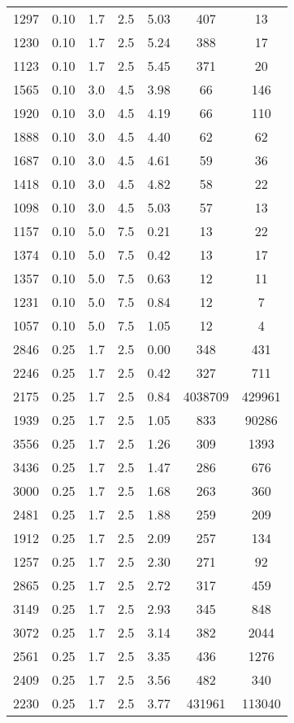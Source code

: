 \documentclass{aastex62}
\begin{document}
\begin{table}
\begin{tabular}{ccccccc}
1297 & 0.10 & 1.7 & 2.5 & 5.03 & 407 & 13 \\ 
1230 & 0.10 & 1.7 & 2.5 & 5.24 & 388 & 17 \\ 
1123 & 0.10 & 1.7 & 2.5 & 5.45 & 371 & 20 \\ 
1565 & 0.10 & 3.0 & 4.5 & 3.98 & 66 & 146 \\ 
1920 & 0.10 & 3.0 & 4.5 & 4.19 & 66 & 110 \\ 
1888 & 0.10 & 3.0 & 4.5 & 4.40 & 62 & 62 \\ 
1687 & 0.10 & 3.0 & 4.5 & 4.61 & 59 & 36 \\ 
1418 & 0.10 & 3.0 & 4.5 & 4.82 & 58 & 22 \\ 
1098 & 0.10 & 3.0 & 4.5 & 5.03 & 57 & 13 \\ 
1157 & 0.10 & 5.0 & 7.5 & 0.21 & 13 & 22 \\ 
1374 & 0.10 & 5.0 & 7.5 & 0.42 & 13 & 17 \\ 
1357 & 0.10 & 5.0 & 7.5 & 0.63 & 12 & 11 \\ 
1231 & 0.10 & 5.0 & 7.5 & 0.84 & 12 & 7 \\ 
1057 & 0.10 & 5.0 & 7.5 & 1.05 & 12 & 4 \\ 
2846 & 0.25 & 1.7 & 2.5 & 0.00 & 348 & 431 \\ 
2246 & 0.25 & 1.7 & 2.5 & 0.42 & 327 & 711 \\ 
2175 & 0.25 & 1.7 & 2.5 & 0.84 & 4038709 & 429961 \\ 
1939 & 0.25 & 1.7 & 2.5 & 1.05 & 833 & 90286 \\ 
3556 & 0.25 & 1.7 & 2.5 & 1.26 & 309 & 1393 \\ 
3436 & 0.25 & 1.7 & 2.5 & 1.47 & 286 & 676 \\ 
3000 & 0.25 & 1.7 & 2.5 & 1.68 & 263 & 360 \\ 
2481 & 0.25 & 1.7 & 2.5 & 1.88 & 259 & 209 \\ 
1912 & 0.25 & 1.7 & 2.5 & 2.09 & 257 & 134 \\ 
1257 & 0.25 & 1.7 & 2.5 & 2.30 & 271 & 92 \\ 
2865 & 0.25 & 1.7 & 2.5 & 2.72 & 317 & 459 \\ 
3149 & 0.25 & 1.7 & 2.5 & 2.93 & 345 & 848 \\ 
3072 & 0.25 & 1.7 & 2.5 & 3.14 & 382 & 2044 \\ 
2561 & 0.25 & 1.7 & 2.5 & 3.35 & 436 & 1276 \\ 
2409 & 0.25 & 1.7 & 2.5 & 3.56 & 482 & 340 \\ 
2230 & 0.25 & 1.7 & 2.5 & 3.77 & 431961 & 113040 \\ 

\end{tabular}
\end{table}
\end{document}
